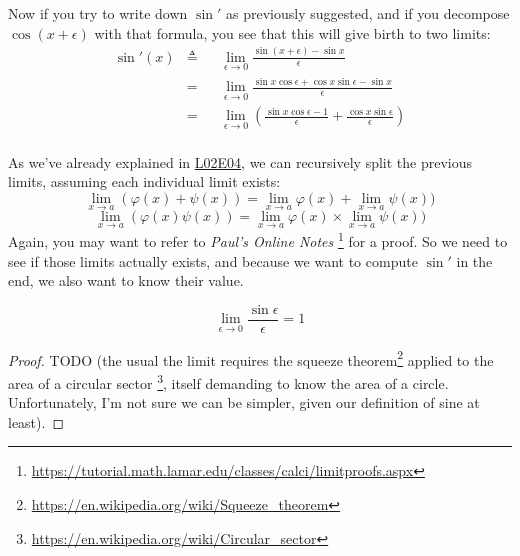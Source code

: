 \documentclass[solutions.tex]{subfiles}
\begin{document}
Now if you try to write down $\sin'$ as previously suggested,
and if you decompose $\cos(x+\epsilon)$ with that formula, you see
that this will give birth to two limits:
\begin{equation*} \begin{aligned}
	\sin'(x) &\triangleq&& \lim_{\epsilon \rightarrow 0}
		\frac{\sin(x+\epsilon)-\sin x}{\epsilon} \\
	~ &=&& \lim_{\epsilon \rightarrow 0}
		\frac{\sin x\cos\epsilon+\cos x\sin\epsilon-\sin x}{\epsilon} \\
	~ &=&& \lim_{\epsilon \rightarrow 0}\left(
		\frac{\sin x\cos\epsilon-1}{\epsilon}+\frac{\cos x\sin\epsilon}{\epsilon}
		\right) \\
\end{aligned} \end{equation*}

As we've already explained in
\href{https://github.com/mbivert/ttm/blob/master/cm/L02E04.pdf}{L02E04},
we can recursively split the previous limits, assuming each individual
limit exists:
\[
	\lim_{x \rightarrow a}\left(\varphi(x)+\psi(x)\right) =
		\lim_{x \rightarrow a}\varphi(x)
		+ \lim_{x \rightarrow a}\psi(x))
\]
\[
	\lim_{x \rightarrow a}\left(\varphi(x)\psi(x)\right) =
		\lim_{x \rightarrow a}\varphi(x)
		\times\lim_{x \rightarrow a}\psi(x))
\]
Again, you may want to refer to \textit{Paul's Online Notes}
\footnote{\url{https://tutorial.math.lamar.edu/classes/calci/limitproofs.aspx}}
for a proof. So we need to see if those limits actually exists, and
because we want to compute $\sin'$ in the end, we also want to know
their value.

\begin{theorem}
\[
	\boxed{\lim_{\epsilon\rightarrow 0} \frac{\sin\epsilon}{\epsilon} = 1}
\]
\end{theorem}
\begin{proof}
TODO (the usual  the limit requires the squeeze
theorem\footnote{\url{
https://en.wikipedia.org/wiki/Squeeze\_theorem}} applied to
the area of a circular sector
\footnote{\url{https://en.wikipedia.org/wiki/Circular\_sector}},
itself demanding to know the area of a circle. Unfortunately,
I'm not sure we can be simpler, given our definition of sine
at least).
\end{proof}
\end{document}

